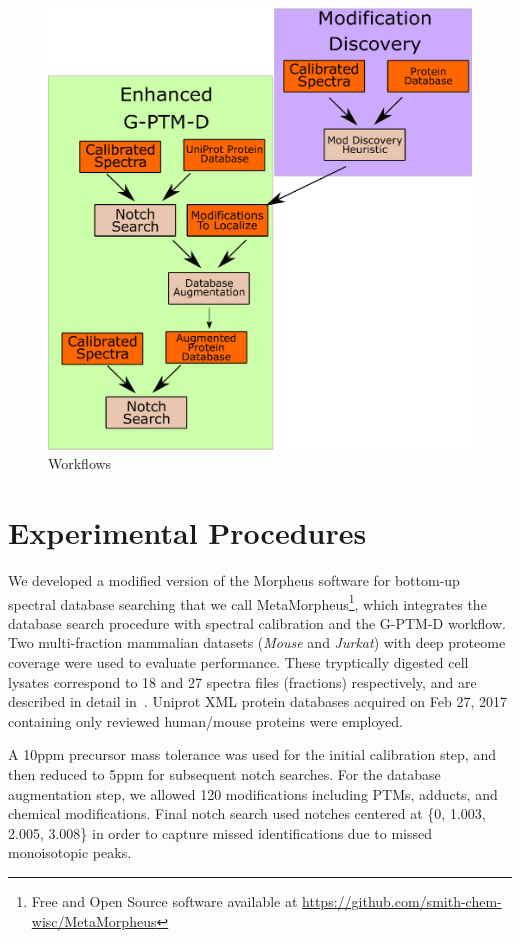 \documentclass[journal=jprobs,manuscript=article]{achemso}
\begin{document}
\begin{figure}
  \includegraphics{diagram.eps}
  \caption{Workflows}
  \label{fgr:diagram}
\end{figure}


\section{Experimental Procedures}
We developed a modified version of the Morpheus software for bottom-up spectral database searching\cite{Wenger_2013} that we call MetaMorpheus\footnote{Free and Open Source software available at \url{https://github.com/smith-chem-wisc/MetaMorpheus}}, which integrates the database search procedure with spectral calibration and the G-PTM-D workflow.
Two multi-fraction mammalian datasets (\textit{Mouse} and \textit{Jurkat}) with deep proteome coverage were used to evaluate performance. These tryptically digested cell lysates correspond to 18 and 27 spectra files (fractions) respectively, and are described in detail in~\cite{Shortreed_2015, Cesnik_2016}.
Uniprot XML protein databases acquired on Feb 27, 2017 containing only reviewed human/mouse proteins were employed. 

A 10ppm precursor mass tolerance was used for the initial calibration step, and then reduced to 5ppm for subsequent notch searches.
For the database augmentation step, we allowed 120 modifications including PTMs, adducts, and chemical modifications.
Final notch search used notches centered at \{0, 1.003, 2.005, 3.008\} in order to capture missed identifications due to missed monoisotopic peaks.
\end{document}
